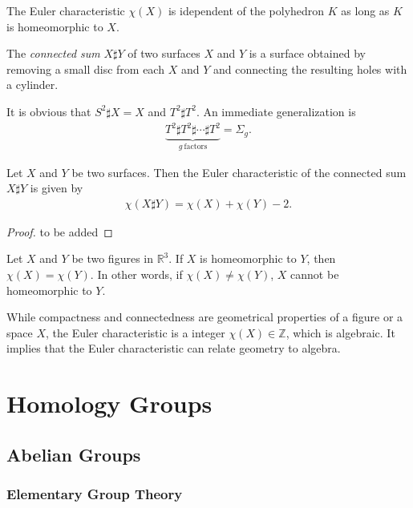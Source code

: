 \documentclass[10pt]{article}
\begin{document}
\begin{theorem}
    The Euler characteristic $\chi(X)$ is idependent of the polyhedron $K$ as long as $K$ is homeomorphic to $X$.
\end{theorem}

The \textit{connected sum} $X \sharp Y$ of two surfaces $X$ and $Y$ is a surface obtained by removing a small disc from each $X$ and $Y$ and connecting the resulting holes with a cylinder.

It is obvious that $ S^{2} \sharp X=X $ and $T^{2}\sharp T^{2}$.
An immediate generalization is
\begin{align}
    \underbrace{T^{2}\sharp T^{2}\sharp\cdots\sharp T^{2}}_{g\ \text{factors}}=\Sigma_g.
\end{align}

\begin{theorem}
    Let $X$ and $Y$ be two surfaces.
    Then the Euler characteristic of the connected sum $X\sharp Y$ is given by
    \begin{align}
        \chi(X\sharp Y)=\chi(X)+\chi(Y)-2.
    \end{align}
\end{theorem}
\begin{proof}
    to be added
\end{proof}

\begin{theorem}
    Let $X$ and $Y$ be two figures in $\mathbb{R}^3$.
    If $X$ is homeomorphic to $Y$, then $\chi(X)=\chi(Y)$.
    In other words, if $\chi(X)\neq\chi(Y)$, $X$ cannot be homeomorphic to $Y$.
\end{theorem}
While compactness and connectedness are geometrical properties of a figure or a space $X$, the Euler characteristic is a integer $\chi(X)\in\mathbb{Z}$, which is algebraic.
It implies that the Euler characteristic can relate geometry to algebra.

\clearpage
\section{Homology Groups}
\subsection{Abelian Groups}
\subsubsection{Elementary Group Theory}
\end{document}
